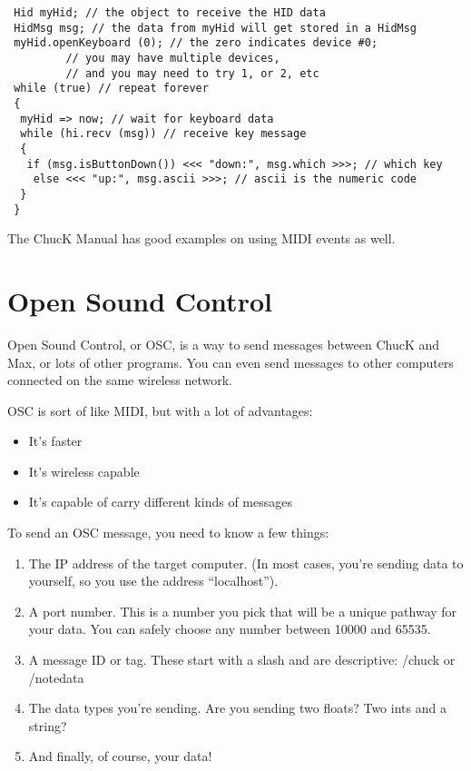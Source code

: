 \documentclass{article}
\begin{document}
\begin{lstlisting}
 Hid myHid; // the object to receive the HID data
 HidMsg msg; // the data from myHid will get stored in a HidMsg
 myHid.openKeyboard (0); // the zero indicates device #0;
         // you may have multiple devices,
         // and you may need to try 1, or 2, etc
 while (true) // repeat forever
 {
  myHid => now; // wait for keyboard data
  while (hi.recv (msg)) // receive key message
  {
   if (msg.isButtonDown()) <<< "down:", msg.which >>>; // which key
    else <<< "up:", msg.ascii >>>; // ascii is the numeric code
  }
 }
\end{lstlisting}

The ChucK Manual has good examples on using MIDI events as well.

\section{Open Sound Control}

Open Sound Control, or OSC, is a way to send messages between ChucK and Max, or lots of other programs. You can even send messages to other computers connected on the same wireless network.

OSC is sort of like MIDI, but with a lot of advantages:
\begin{itemize}
\item It's faster
\item It's wireless capable
\item It's capable of carry different kinds of messages
\end{itemize}

To send an OSC message, you need to know a few things:

\begin{enumerate}
\item The IP address of the target computer. (In most cases, you're sending data to yourself, so you use the address ``localhost'').
\item A port number. This is a number you pick that will be a unique pathway for your data. You can safely choose any number between 10000 and 65535.
\item A message ID or tag. These start with a slash and are descriptive: /chuck or /notedata
\item The data types you're sending. Are you sending two floats? Two ints and a string?
\item And finally, of course, your data!
\end {enumerate}
\end{document}
